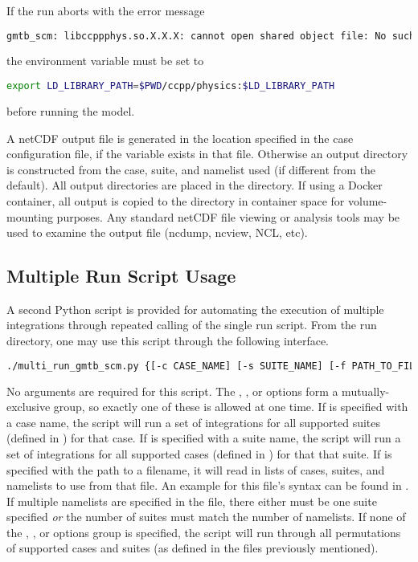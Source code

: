 If the run aborts with the error message
\begin{lstlisting}[language=bash]
gmtb_scm: libccppphys.so.X.X.X: cannot open shared object file: No such file or directory
\end{lstlisting}
the environment variable  must be set to
\begin{lstlisting}[language=bash]
export LD_LIBRARY_PATH=$PWD/ccpp/physics:$LD_LIBRARY_PATH
\end{lstlisting}
before running the model.

A netCDF output file is generated in the location specified in the case
configuration file, if the  variable exists in that file. Otherwise an output directory is constructed from the case, suite, and namelist used (if different from the default). All output directories are placed in the  directory. If using a Docker container, all output is copied to the  directory in container space for volume-mounting purposes. Any standard netCDF file viewing or analysis tools may be used to
examine the output file (ncdump, ncview, NCL, etc).

\subsection{Multiple Run Script Usage}\label{subsection: multirunscript}

A second Python script is provided for automating the execution of multiple integrations through repeated calling of the single run script. From the run directory, one may use this script through the following interface.

\begin{lstlisting}[language=bash]
./multi_run_gmtb_scm.py {[-c CASE_NAME] [-s SUITE_NAME] [-f PATH_TO_FILE]} [-v{v}] [-t] [-d]
\end{lstlisting}

No arguments are required for this script. The , , or  options form a mutually-exclusive group, so exactly one of these is allowed at one time. If  is specified with a case name, the script will run a set of integrations for all supported suites (defined in ) for that case. If  is specified with a suite name, the script will run a set of integrations for all supported cases (defined in ) for that that suite. If  is specified with the path to a filename, it will read in lists of cases, suites, and namelists to use from that file. An example for this file's syntax can be found in . If multiple namelists are specified in the file, there either must be one suite specified \emph{or} the number of suites must match the number of namelists. If none of the , , or  options group is specified, the script will run through all permutations of supported cases and suites (as defined in the files previously mentioned).

